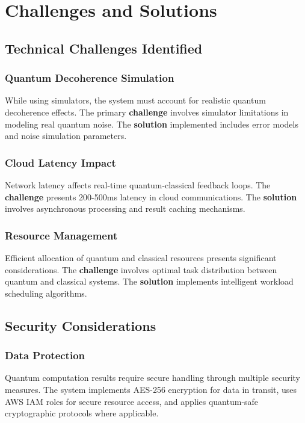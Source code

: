 \documentclass[onecolumn]{IEEEtran}
\begin{document}
\section{Challenges and Solutions}

\subsection{Technical Challenges Identified}

\subsubsection{Quantum Decoherence Simulation}
While using simulators, the system must account for realistic quantum decoherence effects. The primary \textbf{challenge} involves simulator limitations in modeling real quantum noise. The \textbf{solution} implemented includes error models and noise simulation parameters.

\subsubsection{Cloud Latency Impact}
Network latency affects real-time quantum-classical feedback loops. The \textbf{challenge} presents 200-500ms latency in cloud communications. The \textbf{solution} involves asynchronous processing and result caching mechanisms.

\subsubsection{Resource Management}
Efficient allocation of quantum and classical resources presents significant considerations. The \textbf{challenge} involves optimal task distribution between quantum and classical systems. The \textbf{solution} implements intelligent workload scheduling algorithms.

\subsection{Security Considerations}

\subsubsection{Data Protection}
Quantum computation results require secure handling through multiple security measures. The system implements AES-256 encryption for data in transit, uses AWS IAM roles for secure resource access, and applies quantum-safe cryptographic protocols where applicable.
\end{document}
